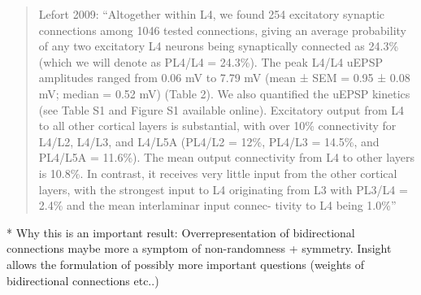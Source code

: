 \blockquote{Lefort 2009: \enquote{Altogether within L4, we found 254
    excitatory synaptic connections among 1046 tested connections,
    giving an average probability of any two excitatory L4 neurons
    being synaptically connected as 24.3\% (which we will denote as
    PL4/L4 = 24.3\%). The peak L4/L4 uEPSP amplitudes ranged from 0.06
    mV to 7.79 mV (mean ± SEM = 0.95 ± 0.08 mV; median = 0.52 mV)
    (Table 2). We also quantified the uEPSP kinetics (see Table S1 and
    Figure S1 available online).  Excitatory output from L4 to all other cortical layers is
    substantial, with over 10\% connectivity for L4/L2, L4/L3, and
    L4/L5A (PL4/L2 = 12\%, PL4/L3 = 14.5\%, and PL4/L5A = 11.6\%). The
    mean output connectivity from L4 to other layers is 10.8\%. In
    contrast, it receives very little input from the other cortical
    layers, with the strongest input to L4 originating from L3 with
    PL3/L4 = 2.4\% and the mean interlaminar input connec- tivity to
    L4 being 1.0\%}}


* Why this is an important result: Overrepresentation of bidirectional connections maybe more a symptom of non-randomness + symmetry. Insight allows the formulation of possibly more important questions (weights of bidirectional connections etc..)
